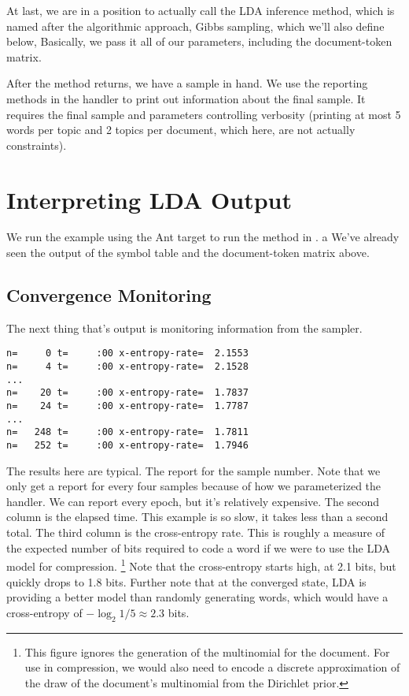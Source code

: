 At last, we are in a position to actually call the LDA inference
method, which is named after the algorithmic approach, Gibbs
sampling, which we'll also define below,
%
%
Basically, we pass it all of our parameters, including the
document-token matrix.

After the method returns, we have a sample in hand.  We use the
reporting methods in the handler to print out information about the
final sample.  It requires the final sample and parameters controlling
verbosity (printing at most 5 words per topic and 2 topics per
document, which here, are not actually constraints).
%


\section{Interpreting LDA Output}

We run the example using the Ant target  to
run the  method in .  
a
%
%
We've already seen the output of the symbol table and the 
document-token matrix above.  

\subsection{Convergence Monitoring}

The next thing that's output is monitoring information from the
sampler.
%
\begin{verbatim}
n=     0 t=     :00 x-entropy-rate=  2.1553
n=     4 t=     :00 x-entropy-rate=  2.1528
...
n=    20 t=     :00 x-entropy-rate=  1.7837
n=    24 t=     :00 x-entropy-rate=  1.7787
...
n=   248 t=     :00 x-entropy-rate=  1.7811
n=   252 t=     :00 x-entropy-rate=  1.7946
\end{verbatim}
%
The results here are typical.  The report for the sample number.  Note
that we only get a report for every four samples because of how we
parameterized the handler.  We can report every epoch, but it's
relatively expensive.  The second column is the elapsed time.  This
example is so slow, it takes less than a second total.  The third
column is the cross-entropy rate.  This is roughly a measure of the
expected number of bits required to code a word if we were to use
the LDA model for compression.%
%
\footnote{This figure ignores the generation of the multinomial for
  the document. For use in compression, we would also need to encode a
  discrete approximation of the draw of the document's multinomial
  from the Dirichlet prior.}
%
Note that the cross-entropy starts high, at 2.1 bits, but quickly
drops to 1.8 bits.  Further note that at the converged state, LDA is
providing a better model than randomly generating words, which would
have a cross-entropy of $- \log_2 1/5 \approx 2.3$ bits.

